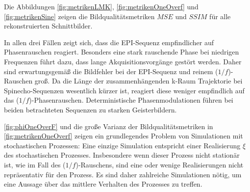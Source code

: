 Die Abbildungen \ref{fig:metrikenLMK}, \ref{fig:metrikenOneOverf} und \ref{fig:metrikenSine} zeigen die Bildqualitätsmetriken $MSE$ und $SSIM$ für alle rekonstruierten Schnittbilder.

In allen drei Fällen zeigt sich, dass die EPI-Sequenz empfindlicher auf Phasenrauschen reagiert. Besonders eine stark rauschende Phase bei niedrigen Frequenzen führt dazu, dass lange Akquisitionsvorgänge gestört werden. Daher sind erwartungsgemäß die Bildfehler bei der EPI-Sequenz und reinem ($1/f$)-Rauschen groß. Da die Länge der zusammenhängenden k-Raum Trajektorie bei Spinecho-Sequenzen wesentlich kürzer ist, reagiert diese weniger empfindlich auf das ($1/f$)-Phasenrauschen. Deterministische Phasenmodulationen führen bei beiden betrachteten Sequenzen zu starken Geisterbildern.

\autoref{fig:phiOneOverF} und die große Varianz der Bildqualitätsmetriken in \autoref{fig:metrikenOneOverf} zeigen ein grundlegendes Problem von Simulationen mit stochastischen Prozessen: Eine einzige Simulation entspricht einer Realisierung $\xi$ des stochastischen Prozesses. Insbesondere wenn dieser Prozess nicht stationär ist, wie im Fall des ($1/f$)-Rauschens, sind eine oder wenige Realisierungen nicht repräsentativ für den Prozess. Es sind daher zahlreiche Simulationen nötig, um eine Aussage über das mittlere Verhalten des Prozesses zu treffen. 

















